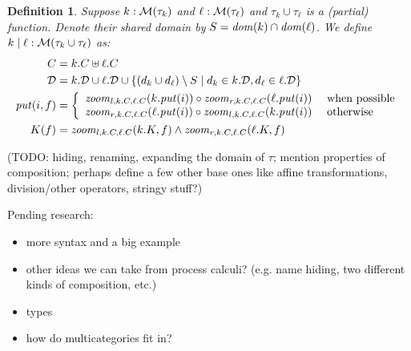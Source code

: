 \documentclass{article}
\newtheorem{definition}{Definition}
\begin{document}
\begin{definition}
    Suppose $k : \mathcal M(\tau_k)$ and $\ell : \mathcal M(\tau_\ell)$ and
    $\tau_k\cup\tau_\ell$ is a (partial) function. Denote their shared
    domain by $S=\mathit{dom}(k) \cap \mathit{dom}(\ell)$. We define $k\mid\ell :
    \mathcal M(\tau_k\cup\tau_\ell)$ as:
    \begin{align*}
        C &= k.C \uplus \ell.C \\
        \mathcal D &= k.\mathcal D \cup \ell.\mathcal D \cup
            \{(d_k \cup d_\ell) \setminus S
            \mid d_k \in k.\mathcal D, d_\ell \in \ell.\mathcal D\} \\
        \mathit{put}(i,f) &= \left\{\begin{array}{ll}
            \mathit{zoom}_{l,k.C,\ell.C}(k.\mathit{put}(i)) \circ \mathit{zoom}_{r,k.C,\ell.C}(\ell.\mathit{put}(i))
                & \mbox{ when possible} \\
            \mathit{zoom}_{r,k.C,\ell.C}(\ell.\mathit{put}(i)) \circ \mathit{zoom}_{l,k.C,\ell.C}(k.\mathit{put}(i))
                & \mbox{ otherwise}
            \end{array}\right. \\
        K(f) &= \mathit{zoom}_{l,k.C,\ell.C}(k.K,f) \land \mathit{zoom}_{r,k.C,\ell.C}(\ell.K,f)
    \end{align*}
\end{definition}

(TODO: hiding, renaming, expanding the domain of $\tau$;
mention properties of composition; perhaps define a few other base ones like
affine transformations, division/other operators, stringy stuff?)

Pending research:
\begin{itemize}
    \item more syntax and a big example
    \item other ideas we can take from process calculi? (e.g. name hiding,
        two different kinds of composition, etc.)
    \item types
    \item how do multicategories fit in?
\end{itemize}
\end{document}
